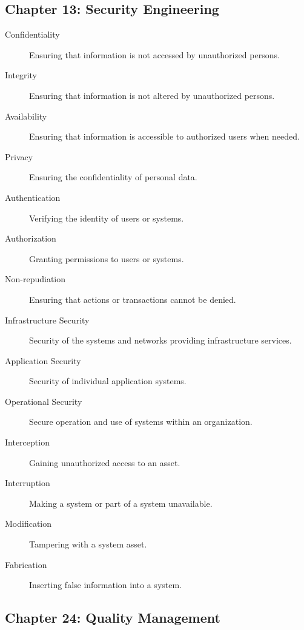 \documentclass{article}
\begin{document}
\subsection{Chapter 13: Security Engineering}

\begin{description}
  \item[Confidentiality] Ensuring that information is not accessed by unauthorized persons.
  \item[Integrity] Ensuring that information is not altered by unauthorized persons.
  \item[Availability] Ensuring that information is accessible to authorized users when needed.
  \item[Privacy] Ensuring the confidentiality of personal data.
  \item[Authentication] Verifying the identity of users or systems.
  \item[Authorization] Granting permissions to users or systems.
  \item[Non-repudiation] Ensuring that actions or transactions cannot be denied.
  \item[Infrastructure Security] Security of the systems and networks providing infrastructure services.
  \item[Application Security] Security of individual application systems.
  \item[Operational Security] Secure operation and use of systems within an organization.
  \item[Interception] Gaining unauthorized access to an asset.
  \item[Interruption] Making a system or part of a system unavailable.
  \item[Modification] Tampering with a system asset.
  \item[Fabrication] Inserting false information into a system.
\end{description}
\subsection{Chapter 24: Quality Management}
\end{document}
